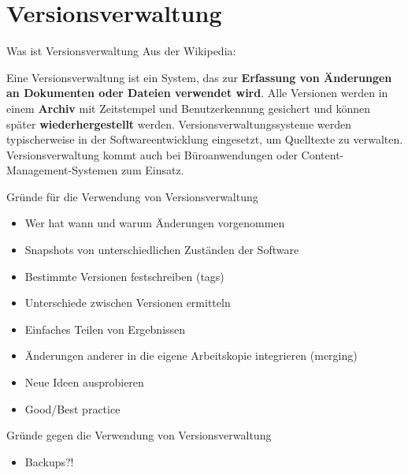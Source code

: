 \section{Versionsverwaltung}

\begin{frame}
  \tableofcontents[currentsection]
\end{frame}

\begin{frame}{Was ist Versionsverwaltung}
Aus der Wikipedia:

Eine Versionsverwaltung ist ein System,
das zur \textbf{Erfassung von Änderungen an
Dokumenten oder Dateien verwendet wird}.
Alle Versionen werden in einem \textbf{Archiv} mit
Zeitstempel und Benutzerkennung gesichert und können
später \textbf{wiederhergestellt} werden.
Versionsverwaltungssysteme werden typischerweise in der
Softwareentwicklung eingesetzt, um Quelltexte zu verwalten.
Versionsverwaltung kommt auch bei Büroanwendungen oder
Content-Management-Systemen zum Einsatz.
\end{frame}

\begin{frame}{Gründe für die Verwendung von Versionsverwaltung}
  \begin{itemize}
    \item Wer hat wann und warum Änderungen vorgenommen
    \item Snapshots von unterschiedlichen Zuständen der Software
    \item Bestimmte Versionen festschreiben (tags)
    \item Unterschiede zwischen Versionen ermitteln
    \item Einfaches Teilen von Ergebnissen
    \item Änderungen anderer in die eigene Arbeitskopie integrieren (merging)
    \item Neue Ideen ausprobieren
    \item Good/Best practice
  \end{itemize}
\end{frame}

\begin{frame}{Gründe gegen die Verwendung von Versionsverwaltung}
  \begin{itemize}
    \item Backups?!
  \end{itemize}
\end{frame}

